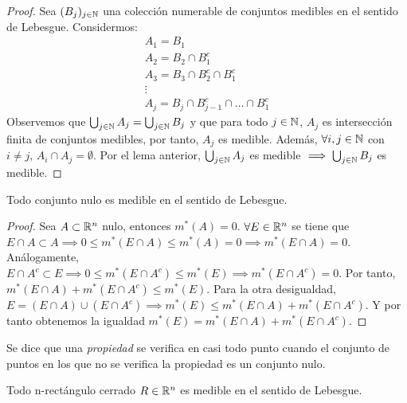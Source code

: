 \begin{proof}
    Sea $(B_j)_{j \in \mathbb{N}}$ una colección numerable de conjuntos medibles en el sentido de Lebesgue. Considermos:
    \[\begin{matrix}
            A_1 = B_1                       \\
            A_2 = B_2 \cap B_1^c            \\
            A_3 = B_3 \cap B_2^c \cap B_1^c \\
            \vdots                          \\
            A_j = B_j \cap B_{j-1}^c \cap \ldots \cap B_1^c
        \end{matrix}\]
    Observemos que $\bigcup_{j \in \mathbb{N}} A_j = \bigcup_{j \in \mathbb{N}} B_j$ y que para
    todo $j \in \mathbb{N}$, $A_j$ es intersección finita de conjuntos medibles, por tanto,
    $A_j$ es medible. Además, $\forall i,j \in \mathbb{N}$ con $i \neq j$, $A_i \cap A_j =
        \emptyset$. Por el lema anterior, $\bigcup_{j \in \mathbb{N}} A_j$ es medible $\implies
        \bigcup_{j \in \mathbb{N}} B_j$ es medible.
\end{proof}

\begin{proposición}
Todo conjunto nulo es medible en el sentido de Lebesgue.
\end{proposición}

\begin{proof}
    Sea $A \subset \mathbb{R}^n$ nulo, entonces $m^*(A) = 0$. $\forall E \in \mathbb{R}^n$ se tiene que $E \cap A \subset A \implies 0 \leq m^*(E \cap A) \leq m^*(A) = 0 \implies m^*(E \cap A) = 0$. Análogamente, $E \cap A^c \subset E \implies 0 \leq m^*(E \cap A^c) \leq m^*(E) \implies m^*(E \cap A^c) = 0$. Por tanto, $m^*(E \cap A) + m^*(E \cap A^c) \leq m^*(E)$. Para la otra desigualdad, $E = (E \cap A) \cup (E \cap A^c) \implies m^*(E) \leq m^*(E \cap A) + m^*(E \cap A^c)$. Y por tanto obtenemos la igualdad $m^*(E) = m^*(E \cap A) + m^*(E \cap A^c)$.
\end{proof}

\begin{definición}
Se dice que una \textit{propiedad} se verifica en casi todo punto cuando el conjunto de puntos en los que no se verifica la propiedad es un conjunto nulo.
\end{definición} \label{Propiedad en casi todo punto}

\begin{proposición}
Todo n-rectángulo cerrado $R \in \mathbb{R}^n$ es medible en el sentido de Lebesgue.
\end{proposición}

